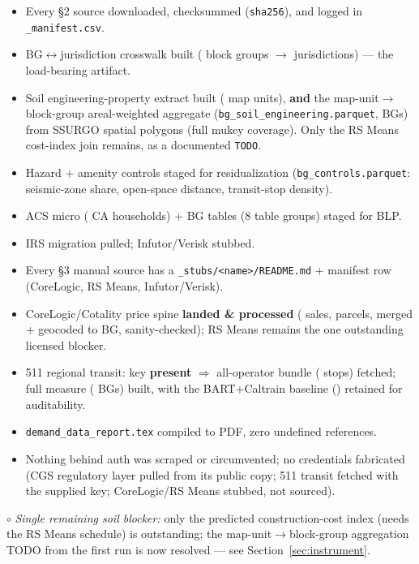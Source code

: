 \newcommand{\yes}{\textcolor{green!55!black}{\checkmark}}
\newcommand{\no}{\textcolor{red}{\ding{55}}}
\newcommand{\partialmark}{\textcolor{orange!90!black}{$\circ$}}

\begin{itemize}[leftmargin=2.2em, itemsep=2pt]
\item[\yes] Every \S2 source downloaded, checksummed (\texttt{sha256}), and
  logged in \texttt{\_manifest.csv}.
\item[\yes] BG$\leftrightarrow$jurisdiction crosswalk built (\NBG{} block
  groups $\to$ \NJURIS{} jurisdictions) --- the load-bearing artifact.
\item[\yes] Soil engineering-property extract built (\NMAPUNITS{} map units),
  \textbf{and} the map-unit$\to$block-group areal-weighted aggregate
  (\texttt{bg\_soil\_engineering.parquet}, \NSOILBG{} BGs) from \NSOILPOLY{}
  SSURGO spatial polygons (full mukey coverage). Only the RS Means cost-index
  join remains, as a documented \texttt{TODO}.
\item[\yes] Hazard + amenity controls staged for residualization
  (\texttt{bg\_controls.parquet}: seismic-zone share, open-space distance,
  transit-stop density).
\item[\yes] ACS micro (\NPUMSHH{} CA households) + BG tables (8 table groups)
  staged for BLP.
\item[\yes] IRS migration pulled; Infutor/Verisk stubbed.
\item[\yes] Every \S3 manual source has a \texttt{\_stubs/<name>/README.md} +
  manifest row (CoreLogic, RS Means, Infutor/Verisk).
\item[\yes] CoreLogic/Cotality price spine \textbf{landed \& processed}
  (\CLNTX{} sales, \CLNPARCEL{} parcels, merged + geocoded to BG, sanity-checked);
  RS Means remains the one outstanding licensed blocker.
\item[\yes] 511 regional transit: key \textbf{present} $\Rightarrow$ all-operator
  bundle (\NSTOPS{} stops) fetched; full measure 
  (\NTRANSITBG{} BGs) built, with the BART+Caltrain baseline
  () retained for auditability.
\item[\yes] \texttt{demand\_data\_report.tex} compiled to PDF, zero undefined
  references.
\item[\yes] Nothing behind auth was scraped or circumvented; no credentials
  fabricated (CGS regulatory layer pulled from its public copy; 511 transit
  fetched with the supplied key; CoreLogic/RS Means stubbed, not sourced).
\end{itemize}

\noindent\partialmark{} \emph{Single remaining soil blocker:} only the predicted
construction-cost index (needs the RS Means schedule) is outstanding; the
map-unit$\to$block-group aggregation TODO from the first run is now resolved ---
see Section~\ref{sec:instrument}.

